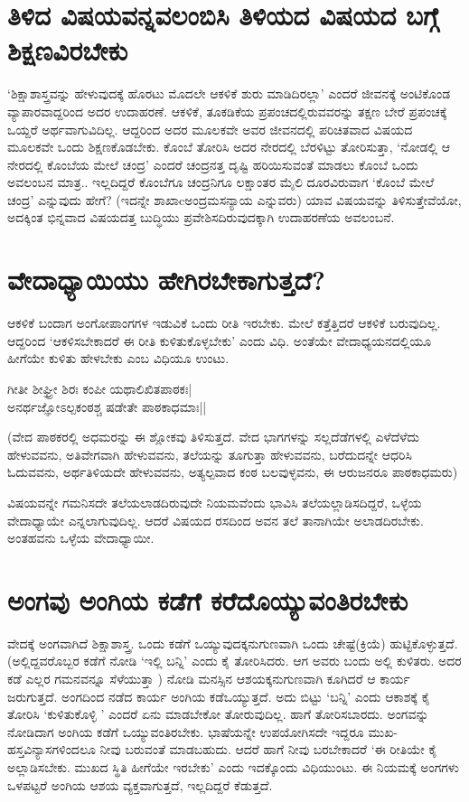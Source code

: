 \section*{ತಿಳಿದ ವಿಷಯವನ್ನವಲಂಬಿಸಿ ತಿಳಿಯದ ವಿಷಯದ ಬಗ್ಗೆ  ಶಿಕ್ಷಣವಿರಬೇಕು}

`ಶಿಕ್ಷಾಶಾಸ್ತ್ರವನ್ನು  ಹೇಳುವುದಕ್ಕೆ  ಹೊರಟು ಮೊದಲೇ ಆಕಳಿಕೆ  ಶುರು ಮಾಡಿದಿರಲ್ಲಾ' ಎಂದರೆ ಜೀವನಕ್ಕೆ  ಅಂಟಿಕೊಂಡ ವ್ಯಾಪಾರವಾದ್ದರಿಂದ ಅದರ ಉದಾಹರಣೆ. ಆಕಳಿಕೆ, ತೂಕಡಿಕೆಯ ಪ್ರಪಂಚದಲ್ಲಿರುವವರನ್ನು  ತಕ್ಷಣ  ಬೇರೆ  ಪ್ರಪಂಚಕ್ಕೆ   ಒಯ್ದರೆ ಅರ್ಥವಾಗುವಿದಿಲ್ಲ. ಆದ್ದರಿಂದ ಅದರ ಮೂಲಕವೇ ಅವರ ಜೀವನದಲ್ಲಿ ಪರಿಚಿತವಾದ ವಿಷಯದ ಮೂಲಕವೇ ಒಂದು ಶಿಕ್ಷಣಕೊಡಬೇಕು. ಕೊಂಬೆ ತೋರಿಸಿ ಅದರ ನೇರದಲ್ಲಿ ಬೆರಳಿಟ್ಟು  ತೋರಿಸುತ್ತಾ, `ನೋಡಲ್ಲಿ ಆ ನೇರದಲ್ಲಿ  ಕೊಂಬೆಯ ಮೇಲೆ ಚಂದ್ರ' ಎಂದರೆ  ಚಂದ್ರನತ್ತ  ದೃಷ್ಟಿ  ಹರಿಯಿಸುವಂತೆ  ಮಾಡಲು ಕೊಂಬೆ ಒಂದು ಅವಲಂಬನ ಮಾತ್ರ..  ಇಲ್ಲದಿದ್ದರೆ ಕೊಂಬೆಗೂ ಚಂದ್ರನಿಗೂ ಲಕ್ಷಾಂತರ ಮೈಲಿ ದೂರವಿರುವಾಗ `ಕೊಂಬೆ ಮೇಲೆ ಚಂದ್ರ' ಎನ್ನುವುದು ಹೇಗೆ? (ಇದನ್ನೇ ಶಾಖಾcಅಂದ್ರಮಸನ್ಯಾಯ  ಎನ್ನುವರು) ಯಾವ ವಿಷಯವನ್ನು ತಿಳಿಸುತ್ತೇವೆಯೋ, ಅದಕ್ಕಿಂತ  ಭಿನ್ನವಾದ ವಿಷಯದತ್ತ  ಬುದ್ಧಿಯು ಪ್ರವೇಶಿಸದಿರುವುದಕ್ಕಾಗಿ ಉದಾಹರಣೆಯ ಅವಲಂಬನೆ. 

\section*{ವೇದಾಧ್ಯಾಯಿಯು ಹೇಗಿರಬೇಕಾಗುತ್ತದೆ?}

ಆಕಳಿಕೆ ಬಂದಾಗ ಅಂಗೋಪಾಂಗಗಳ ಇಡುವಿಕೆ  ಒಂದು ರೀತಿ ಇರಬೇಕು. ಮೇಲೆ ಕತ್ತೆತ್ತಿದರೆ ಆಕಳಿಕೆ ಬರುವುದಿಲ್ಲ. ಆದ್ದರಿಂದ `ಆಕಳಿಸಬೇಕಾದರೆ ಈ ರೀತಿ ಕುಳಿತುಕೊಳ್ಳಬೇಕು' ಎಂದು ವಿಧಿ. ಅಂತೆಯೇ ವೇದಾಧ್ಯಯನದಲ್ಲಿಯೂ ಹೀಗೆಯೇ ಕುಳಿತು ಹೇಳಬೇಕು ಎಂಬ ವಿಧಿಯೂ ಉಂಟು.

\begin{shloka}
ಗೀತೀ ಶೀಘ್ರ್ರೀ ಶಿರಃ ಕಂಪೀ ಯಥಾಲಿಖಿತಪಾಠಕಃ|\\
ಅನರ್ಥಜ್ಞೋಽಲ್ಪಕಂಠಶ್ಚ ಷಡೇತೇ ಪಾಠಕಾಧಮಾಃ||
\end{shloka}

(ವೇದ ಪಾಠಕರಲ್ಲಿ ಅಧಮರನ್ನು  ಈ ಶ್ಲೋಕವು ತಿಳಿಸುತ್ತದೆ. ವೇದ ಭಾಗಗಳನ್ನು  ಸಲ್ಲದೆಡೆಗಳಲ್ಲಿ  ಎಳೆದೆಳೆದು ಹೇಳುವವನು, ಅತಿವೇಗವಾಗಿ ಹೇಳುವವನು, ತಲೆಯನ್ನು  ತೂಗುತ್ತಾ ಹೇಳುವವನು, ಬರೆದುದನ್ನೇ ಆಧರಿಸಿ ಓದುವವನು, ಅರ್ಥತಿಳಿಯದೇ ಹೇಳುವವನು, ಅತ್ಯಲ್ಪವಾದ ಕಂಠ ಬಲವುಳ್ಳವನು, ಈ ಆರುಜನರೂ ಪಾಠಕಾಧಮರು)

ವಿಷಯವನ್ನೇ ಗಮನಿಸದೇ ತಲೆಯಲಾಡದಿರುವುದೇ ನಿಯಮವೆಂದು ಭಾವಿಸಿ ತಲೆಯಲ್ಲಾಡಿಸದಿದ್ದರೆ, ಒಳ್ಳೆಯ ವೇದಾಧ್ಯಾಯೇ ಎನ್ನಲಾಗುವುದಿಲ್ಲ. ಆದರೆ ವಿಷಯದ ರಸದಿಂದ ಅವನ ತಲೆ ತಾನಾಗಿಯೇ ಅಲಾಡದಿರಬೇಕು. ಅಂತಹವನು ಒಳ್ಳೆಯ ವೇದಾಧ್ಯಾಯೀ.

\section*{ಅಂಗವು ಅಂಗಿಯ ಕಡೆಗೆ ಕರೆದೊಯ್ಯುವಂತಿರಬೇಕು}

ವೇದಕ್ಕೆ  ಅಂಗವಾಗಿದೆ ಶಿಕ್ಷಾಶಾಸ್ತ್ರ. ಒಂದು ಕಡೆಗೆ ಒಯ್ಯುವುದಕ್ಕನುಗುಣವಾಗಿ ಒಂದು ಚೇಷ್ಟೆ(ಕ್ರಿಯೆ) ಹುಟ್ಟಿಕೊಳ್ಳುತ್ತದೆ. (ಅಲ್ಲಿದ್ದವರೊಬ್ಬರ ಕಡೆಗೆ ನೋಡಿ `ಇಲ್ಲಿ ಬನ್ನಿ' ಎಂದು ಕೈ ತೋರಿಸಿದರು. ಆಗ ಅವರು ಬಂದು ಅಲ್ಲಿ ಕುಳಿತರು. ಅದರ ಕಡೆ ಎಲ್ಲರ ಗಮನವನ್ನೂ  ಸೆಳೆಯುತ್ತಾ ) ನೋಡಿ ಮನಸ್ಸಿನ ಆಶಯಕ್ಕನುಗುಣವಾಗಿ ಕೂಗಿದರೆ ಆ ಕಾರ್ಯ ಜರುಗುತ್ತದೆ. ಅಂಗದಿಂದ ನಡೆದ ಕಾರ್ಯ ಅಂಗಿಯ ಕಡೆಒಯ್ಯುತ್ತದೆ. ಅದು ಬಿಟ್ಟು  `ಬನ್ನಿ' ಎಂದು  ಆಕಾಶಕ್ಕೆ  ಕೈ ತೋರಿಸಿ  `ಕುಳಿತುಕೊಳ್ಳಿ ' ಎಂದರೆ  ಏನು ಮಾಡಬೇಕೋ ತೋರುವುದಿಲ್ಲ. ಹಾಗೆ ತೋರಿಸಬಾರದು. ಅಂಗವನ್ನು  ನೋಡಿದಾಗ ಅಂಗಿಯ ಕಡೆಗೆ ಒಯ್ಯುವಂತಿರಬೇಕು. ಭಾಷೆಯನ್ನೇ ಉಪಯೋಗಿಸದೇ ಇದ್ದರೂ ಮುಖ-ಹಸ್ತವಿನ್ಯಾಸಗಳಿಂದಲೂ  ನೀವು ಬರುವಂತೆ ಮಾಡಬಹುದು. ಆದರೆ  ಹಾಗೆ ನೀವು ಬರಬೇಕಾದರೆ `ಈ ರೀತಿಯೇ ಕೈ ಅಲ್ಲಾಡಿಸಬೇಕು. ಮುಖದ ಸ್ಥಿತಿ  ಹೀಗೆಯೇ  ಇರಬೇಕು' ಎಂದು ಇದಕ್ಕೊಂದು ವಿಧಿಯುಂಟು. ಈ ನಿಯಮಕ್ಕೆ  ಅಂಗಗಳು ಒಳಪಟ್ಟರೆ ಅಂಗಿಯ ಆಶಯ ವ್ಯಕ್ತವಾಗುತ್ತದೆ, ಇಲ್ಲದಿದ್ದರೆ ಕೆಡುತ್ತದೆ.

